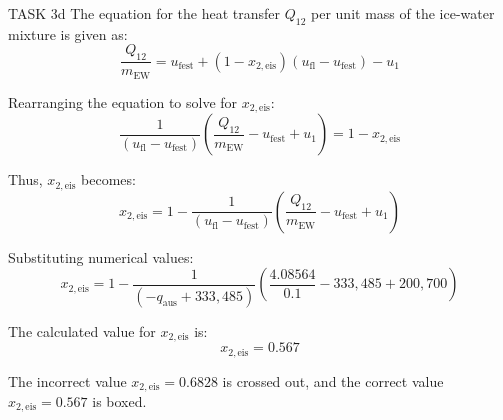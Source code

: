 TASK 3d  
The equation for the heat transfer \( Q_{12} \) per unit mass of the ice-water mixture is given as:  
\[
\frac{Q_{12}}{m_{\text{EW}}} = u_{\text{fest}} + (1 - x_{2,\text{eis}})(u_{\text{fl}} - u_{\text{fest}}) - u_1
\]

Rearranging the equation to solve for \( x_{2,\text{eis}} \):  
\[
\frac{1}{(u_{\text{fl}} - u_{\text{fest}})} \left( \frac{Q_{12}}{m_{\text{EW}}} - u_{\text{fest}} + u_1 \right) = 1 - x_{2,\text{eis}}
\]

Thus, \( x_{2,\text{eis}} \) becomes:  
\[
x_{2,\text{eis}} = 1 - \frac{1}{(u_{\text{fl}} - u_{\text{fest}})} \left( \frac{Q_{12}}{m_{\text{EW}}} - u_{\text{fest}} + u_1 \right)
\]

Substituting numerical values:  
\[
x_{2,\text{eis}} = 1 - \frac{1}{(-q_{\text{aus}} + 333,485)} \left( \frac{4.08564}{0.1} - 333,485 + 200,700 \right)
\]

The calculated value for \( x_{2,\text{eis}} \) is:  
\[
x_{2,\text{eis}} = 0.567
\]

The incorrect value \( x_{2,\text{eis}} = 0.6828 \) is crossed out, and the correct value \( x_{2,\text{eis}} = 0.567 \) is boxed.